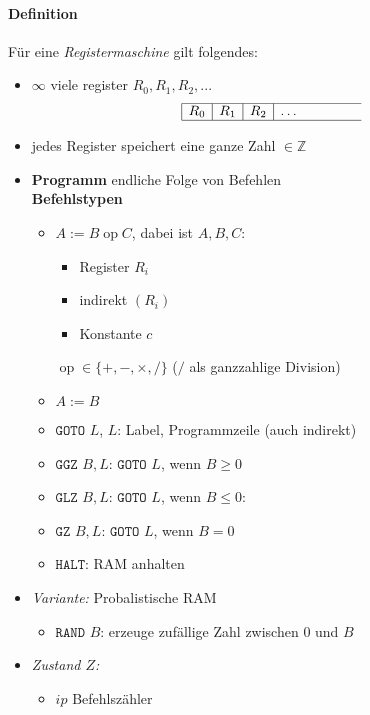 \paragraph{Definition} Für eine \emph{Registermaschine} gilt folgendes:
    \begin{itemize}
    \item $\infty$ viele register $R_0, R_1, R_2, ...$
          \[
           \begin{array}{|c|c|c|ccccc}
            \hline
            R_0 & R_1 & R_2 & \dots & & & & \\
            \hline
           \end{array}
          \]
    \item jedes Register speichert eine ganze Zahl $\in \mathbb{Z}$
    \item \textbf{Programm} endliche Folge von Befehlen\\
		\textbf{Befehlstypen}
		\begin{itemize}
		 \item $A := B \operatorname{op} C$, dabei ist $A,B,C$: 
			\begin{itemize}
			 \item Register $R_i$
			 \item indirekt $(R_i)$
			 \item Konstante $c$
			\end{itemize}
			$\operatorname{op} \in \{+,-,\times,/\}$ ($/$ als ganzzahlige Division)
		 \item $A := B$
         \item $\texttt{GOTO } L$, $L$: Label, Programmzeile (auch indirekt)
         \item $\texttt{GGZ } B, L$: $\texttt{GOTO } L$, wenn $B \geq 0$ 
         \item $\texttt{GLZ } B, L$: $\texttt{GOTO } L$, wenn $B \leq 0:$ 
         \item $\texttt{GZ } B, L$: $\texttt{GOTO } L$, wenn $B = 0$
         \item $\texttt{HALT}$: RAM anhalten
		\end{itemize}
	\item \emph{Variante:} Probalistische RAM
		\begin{itemize}
		 \item $\texttt{RAND } B$: erzeuge zufällige Zahl zwischen 0 und $B$
		\end{itemize}
    \item \emph{Zustand $Z$:}
		\begin{itemize}
		 \item $ip$ Befehlszähler

\end{itemize}
\end{itemize}

